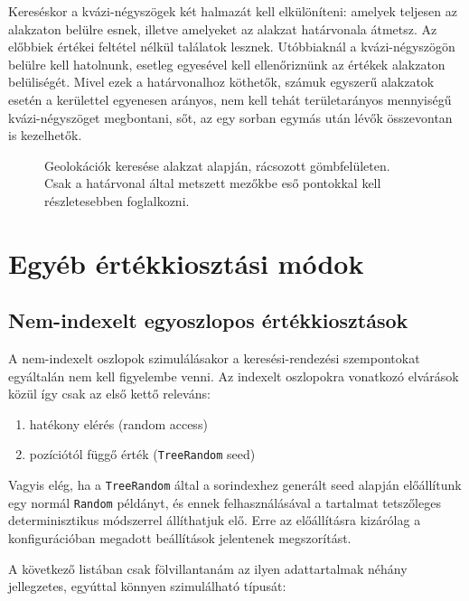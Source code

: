 \documentclass[
    parspace,
    noindent,
    nohyp,
]{elteiktdk}[2023/04/10]
\begin{document}
Kereséskor a kvázi-négyszögek két halmazát kell elkülöníteni:
amelyek teljesen az alakzaton belülre esnek,
illetve amelyeket az alakzat határvonala átmetsz.
Az előbbiek értékei feltétel nélkül találatok lesznek.
Utóbbiaknál a kvázi-négyszögön belülre kell hatolnunk,
esetleg egyesével kell ellenőriznünk az értékek alakzaton belüliségét.
Mivel ezek a határvonalhoz köthetők,
számuk egyszerű alakzatok esetén a kerülettel egyenesen arányos,
nem kell tehát területarányos mennyiségű kvázi-négyszöget megbontani,
sőt, az egy sorban egymás után lévők összevontan is kezelhetők.

\begin{figure}[H]
\centering

\caption[Geolokációk keresése alakzat alapján]{
    Geolokációk keresése alakzat alapján, rácsozott gömbfelületen. \\
    Csak a határvonal által metszett mezőkbe eső pontokkal kell részletesebben foglalkozni.
}
\end{figure}


\section{Egyéb értékkiosztási módok}

\subsection{Nem-indexelt egyoszlopos értékkiosztások}

A nem-indexelt oszlopok szimulálásakor a keresési-rendezési szempontokat egyáltalán nem kell figyelembe venni.
Az indexelt oszlopokra vonatkozó elvárások közül így csak az első kettő releváns:

\begin{enumerate}
    \item hatékony elérés (random access)
    \item pozíciótól függő érték (\texttt{TreeRandom} seed)
\end{enumerate}

Vagyis elég, ha a \texttt{TreeRandom} által a sorindexhez generált seed alapján
előállítunk egy normál \texttt{Random} példányt,
és ennek felhasználásával a tartalmat tetszőleges determinisztikus módszerrel állíthatjuk elő.
Erre az előállításra kizárólag a konfigurációban megadott beállítások jelentenek megszorítást.

A következő listában csak fölvillantanám az ilyen adattartalmak néhány jellegzetes,
egyúttal könnyen szimulálható típusát:
\end{document}
